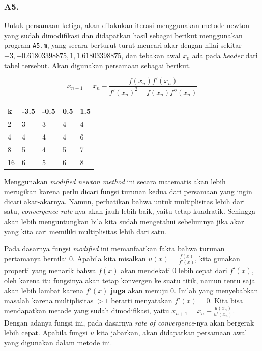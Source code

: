 \documentclass[11pt, a4paper, onecolumn, oneside, final]{report}
\begin{document}
\subsubsection*{A5.}

Untuk persamaan ketiga, akan dilakukan iterasi menggunakan metode newton yang sudah dimodifikasi dan didapatkan hasil sebagai berikut menggunakan program \texttt{A5.m}, yang secara berturut-turut mencari akar dengan nilai sekitar $-3, -0.61803398875, 1, 1.61803398875$, dan tebakan awal $x_0$ ada pada \textit{header} dari tabel tersebut. Akan digunakan persamaan sebagai berikut.

$$
x_{n + 1} = x_n - \frac{f(x_n) f'(x_n)}{f'(x_n)^2 - f(x_n) f''(x_n)}
$$

\begin{table}[H]
\centering
\begin{tabular}{|l|l|l|l|l|}
\hline
k & -3.5 & -0.5 & 0.5 & 1.5 \\ \hline
2 & 3 & 3 & 4 & 4 \\ \hline
4 & 4 & 4 & 4 & 6 \\ \hline
8 & 5 & 4 & 5 & 7 \\ \hline
16 & 6 & 5 & 6 & 8 \\ \hline
\end{tabular}
\end{table}

Menggunakan \textit{modified newton method} ini secara matematis akan lebih merugikan karena perlu dicari fungsi turunan kedua dari persamaan yang ingin dicari akar-akarnya. Namun, perhatikan bahwa untuk multiplisitas lebih dari satu, \textit{convergence rate}-nya akan jauh lebih baik, yaitu tetap kuadratik. Sehingga akan lebih menguntungkan bila kita sudah mengetahui sebelumnya jika akar yang kita cari memiliki multiplisitas lebih dari satu.

Pada dasarnya fungsi \textit{modified} ini memanfaatkan fakta bahwa turunan pertamanya bernilai $0$. Apabila kita misalkan $u(x) = \frac{f(x)}{f'(x)}$, kita gunakan properti yang menarik bahwa $f(x)$ akan mendekati $0$ lebih cepat dari $f'(x)$, oleh karena itu fungsinya akan tetap konvergen ke suatu titik, namun tentu saja akan lebih lambat karena $f'(x)$ \textbf{juga} akan menuju $0$. Inilah yang menyebabkan masalah karena multiplisitas $> 1$ berarti menyatakan $f'(x) = 0$. Kita bisa mendapatkan metode yang sudah dimodifikasi, yaitu $x_{n+1} = x_n - \frac{u(x_n)}{u'(x_n)}$. Dengan adanya fungsi ini, pada dasarnya \textit{rate of convergence}-nya akan bergerak lebih cepat. Apabila fungsi $u$ kita jabarkan, akan didapatkan persamaan awal yang digunakan dalam metode ini.
\end{document}
